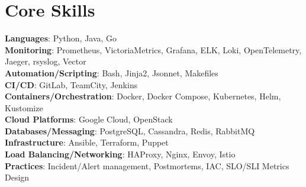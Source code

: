 \documentclass[letterpaper,11pt]{article}
\begin{document}
\section{Core Skills}
 \begin{itemize}[leftmargin=0.15in, label={}]
    \small{\item{
     \textbf{Languages}{: Python, Java, Go} \\
     \textbf{Monitoring}{: Prometheus, VictoriaMetrics, Grafana, ELK, Loki, OpenTelemetry, Jaeger, rsyslog, Vector} \\
     \textbf{Automation/Scripting}{: Bash, Jinja2, Jsonnet, Makefiles} \\
     \textbf{CI/CD}{: GitLab, TeamCity, Jenkins} \\
     \textbf{Containers/Orchestration}{: Docker, Docker Compose, Kubernetes, Helm, Kustomize} \\
     \textbf{Cloud Platforms}{: Google Cloud, OpenStack} \\
     \textbf{Databases/Messaging}{: PostgreSQL, Cassandra, Redis, RabbitMQ} \\
     \textbf{Infrastructure}{: Ansible, Terraform, Puppet} \\
     \textbf{Load Balancing/Networking}{: HAProxy, Nginx, Envoy, Istio} \\
     \textbf{Practices}{: Incident/Alert management, Postmortems, IAC, SLO/SLI Metrics Design} \\
    }}
 \end{itemize}


\end{document}
